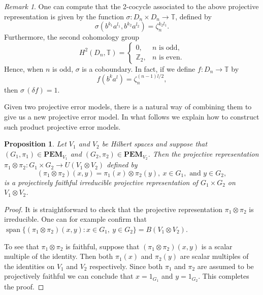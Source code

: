 \documentclass[11pt, oneside, reqno]{amsart}
\newcommand{\bbZ}{\mathbb{Z}}
\newcommand{\bbT}{\mathbb{T}}
\newcommand{\PEM}{\mathbf{PEM}}
\newcommand{\Span}{\operatorname{span}}
\theoremstyle{definition}
\theoremstyle{plain}
\newtheorem{proposition}[definition]{Proposition}
\theoremstyle{remark}
\newtheorem{remark}[definition]{Remark}
\begin{document}
\begin{remark}
    One can compute that the 2-cocycle associated to the above projective representation is given by the function $\sigma \colon D_n \times D_n \to \bbT$, defined by
    \begin{equation*}
        \sigma(b^{k_1}a^{l_1}, b^{k_2}a^{l_2}) = \zeta_n^{k_2 l_1}.
    \end{equation*}
    Furthermore, the second cohomology group
    \begin{equation*}
        H^2(D_n, \bbT) = \begin{cases}
            0, & n \text{ is odd}, \\
            \bbZ_2, & n \text{ is even}.
        \end{cases}
    \end{equation*}
    Hence, when $n$ is odd, $\sigma$ is a coboundary. In fact, if we define $f \colon D_n \to \bbT$ by
    \begin{equation*}
        f(b^ka^l) = \zeta_n^{(n-1)l/2},
    \end{equation*}
    then $\sigma \, (\delta f) = 1$.
\end{remark}

Given two projective error models, there is a natural way of combining them to give us a new projective error model. In what follows we explain how to construct such product projective error models.

\begin{proposition}\label{prop:product error models}
    Let $V_1$ and $V_2$ be Hilbert spaces and suppose that $(G_1, \pi_1) \in \PEM_{V_1}$ and $(G_2, \pi_2) \in \PEM_{V_2}$. Then the projective representation $\pi_1 \otimes \pi_2 \colon G_1 \times G_2 \to U(V_1 \otimes V_2)$ defined by
    \begin{equation*}
        (\pi_1 \otimes \pi_2)(x,y) = \pi_1(x) \otimes \pi_2(y), \ x \in G_1, \text{ and } y \in G_2,
    \end{equation*}
    is a projectively faithful irreducible projective representation of $G_1 \times G_2$ on $V_1 \otimes V_2$.
\end{proposition}
\begin{proof}
    It is straightforward to check that the projective representation $\pi_1 \otimes \pi_2$ is irreducible. One can for example confirm that $\Span\{ (\pi_1 \otimes \pi_2)(x,y) \colon x \in G_1, \ y \in G_2 \} = B(V_1 \otimes V_2)$.

    To see that $\pi_1 \otimes \pi_2$ is faithful, suppose that $(\pi_1 \otimes \pi_2)(x,y)$ is a scalar multiple of the identity. Then both $\pi_1(x)$ and $\pi_2(y)$ are scalar multiples of the identities on $V_1$ and $V_2$ respectively. Since both $\pi_1$ and $\pi_2$ are assumed to be projectively faithful we can conclude that $x = 1_{G_1}$ and $y = 1_{G_2}$. This completes the proof.
\end{proof}
\end{document}
